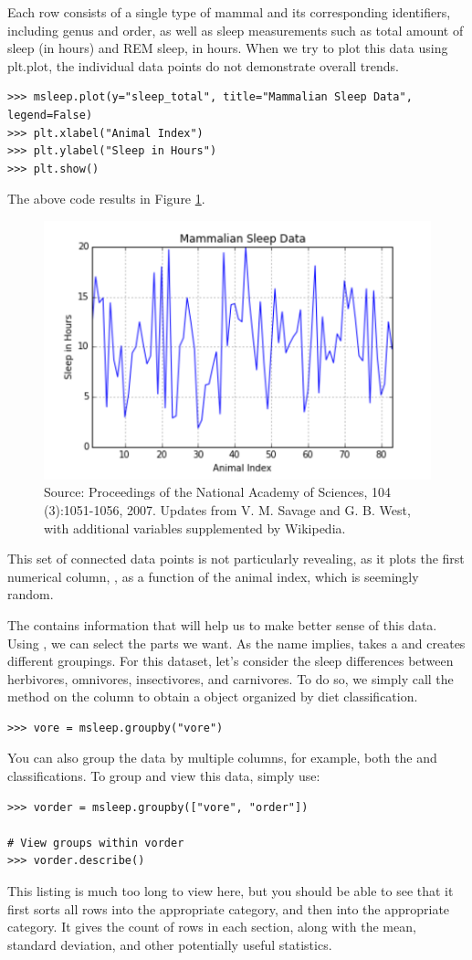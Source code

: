 Each row consists of a single type of mammal and its corresponding identifiers, including genus and order, as well as sleep measurements such as total amount of sleep (in hours) and REM sleep, in hours.
When we try to plot this data using plt.plot, the individual data points do not demonstrate overall trends.
\begin{lstlisting}
>>> msleep.plot(y="sleep_total", title="Mammalian Sleep Data", legend=False)
>>> plt.xlabel("Animal Index")
>>> plt.ylabel("Sleep in Hours")
>>> plt.show()
\end{lstlisting}
The above code results in Figure \ref{fig:sleep}.
\begin{figure}[H] 
    \centering
    \includegraphics[width=.75\textwidth]{Msleep1.pdf}
    \caption{Source:  Proceedings of the National Academy of Sciences, 104 (3):1051-1056, 2007. Updates from V. M. Savage and G. B. West, with additional variables supplemented by Wikipedia.}
    \label{fig:sleep}
\end{figure}
This set of connected data points is not particularly revealing, as it plots the first numerical column, , as a function of the animal index, which is seemingly random.

The  contains information that will help us to make better sense of this data.
Using , we can select the parts we want. As the name implies,  takes a  and creates different groupings. For this dataset, let's consider the sleep differences between herbivores, omnivores, insectivores, and carnivores. To do so, we simply call the  method on the  column to obtain a  object organized by diet classification.
\begin{lstlisting}
>>> vore = msleep.groupby("vore")
\end{lstlisting}
You can also group the data by multiple columns, for example, both the  and  classifications.
To group and view this data, simply use:
\begin{lstlisting}
>>> vorder = msleep.groupby(["vore", "order"])

# View groups within vorder
>>> vorder.describe()
\end{lstlisting}
This listing is much too long to view here, but you should be able to see that it first sorts all rows into the appropriate  category, and then into the appropriate  category.  It gives the count of rows in each section, along with the mean, standard deviation, and other potentially useful statistics.

